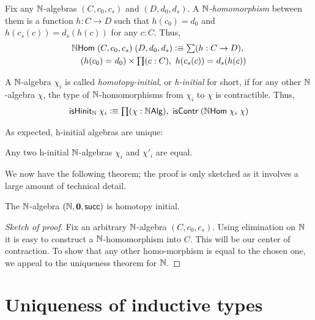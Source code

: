 \begin{defn}
Fix any $\mathbb{N}$-algebras $(C,c_0,c_s)$ and $(D,d_0,d_s)$. A \emph{$\mathbb{N}$-homomorphism} between them is a function $h : C \to D$ such that $h(c_0) = d_0$ and $h(c_s(c)) = d_s(h(c))$ for any $c : C$. Thus,
\begin{align*}
\nhom \; (C,c_0,c_s) \; (D,d_0,d_s) \defeq \sm {h : C \to D} \\ (\id{h(c_0)}{d_0}) \times \prd{c:C} \id{h(c_s(c))}{d_s(h(c))}
\end{align*}
\end{defn}

\begin{defn}
A $\mathbb{N}$-algebra $\chi_i$ is called \emph{homotopy-initial}, or \emph{h-initial} for short, if for any other $\mathbb{N}$-algebra $\chi$, the type of $\mathbb{N}$-homomorphisms from $\chi_i$ to $\chi$ is contractible. Thus,
\begin{align*}
\ishinitn \; \chi_i \defeq \prd{\chi : \nalg} \iscontr \; (\nhom \; \chi_i\; \chi)
\end{align*}
\end{defn}

As expected, h-initial algebras are unique:
\begin{thm}
Any two h-initial $\mathbb{N}$-algebras $\chi_i$ and $\chi'_i$ are equal.
\end{thm}

We now have the following theorem; the proof is only sketched as it involves a large amount of technical detail.
\begin{thm}
The $\mathbb{N}$-algebra $(\mathbb{N}, \mathbf{0}, \mathsf{succ})$ is homotopy initial.
\end{thm}
\begin{proof}[Sketch of proof]
Fix an arbitrary $\mathbb{N}$-algebra $(C,c_0,c_s)$. Using elimination on $\mathbb{N}$ it is easy to construct a $\mathbb{N}$-homomorphism into $C$. This will be our
center of contraction. To show that any other homo-morphism is equal to the chosen one, we appeal to the uniqueness theorem for $\mathbb{N}$.
\end{proof}



\section{Uniqueness of inductive types}
\label{sec:appetizer-univalence}

\newcommand{\natp}{\ensuremath{\nat'}\xspace}
\newcommand{\zp}{\ensuremath{0'}\xspace}
\newcommand{\Sp}{\ensuremath{\suc'}\xspace}
\newcommand{\dblp}{\ensuremath{\mathbf{double'}}}

